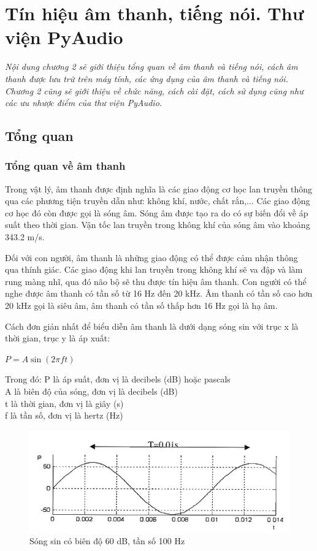 \chapter{Tín hiệu âm thanh, tiếng nói. Thư viện PyAudio}
\ifpdf
    \graphicspath{{Chapter2/Chapter2Figs/PNG/}{Chapter2/Chapter2Figs/PDF/}{Chapter2/Chapter2Figs/}}
\else
    \graphicspath{{Chapter2/Chapter2Figs/EPS/}{Chapter2/Chapter2Figs/}}
\fi
\textit{Nội dung chương 2 sẽ giới thiệu tổng quan về âm thanh và tiếng nói, cách âm thanh được lưu trữ trên máy tính, các ứng dụng của âm thanh và tiếng nói. Chương 2 cũng sẽ giới thiệu về chức năng, cách cài đặt, cách sử dụng cũng như các ưu nhược điểm của thư viện PyAudio.}
\section{Tổng quan}
\subsection{Tổng quan về âm thanh}
Trong vật lý, âm thanh được định nghĩa là các giao động cơ học lan truyền thông qua các phương tiện truyền dẫn như: không khí, nước, chất rắn,... Các giao động cơ học đó còn được gọi là sóng âm. Sóng âm được tạo ra do có sự biến đổi về áp suất theo thời gian. Vận tốc lan truyền trong không khí của sóng âm vào khoảng 343.2 m/s.

Đối với con người, âm thanh là những giao động có thể được cảm nhận thông qua thính giác. Các giao động khi lan truyền trong không khí sẽ va đập và làm rung màng nhĩ, qua đó não bộ sẽ thu được tín hiệu âm thanh. Con người có thể nghe được âm thanh có tần số từ 16 Hz đến 20 kHz. Âm thanh có tần số cao hơn 20 kHz gọi là siêu âm, âm thanh có tần số thấp hơn 16 Hz gọi là hạ âm.

Cách đơn giản nhất để biểu diễn âm thanh là dưới dạng sóng sin với trục x là thời gian, trục y là áp xuất:

\begin{center}
$P = A\sin (2\pi ft)$
\end{center}

Trong đó: P là áp suất, đơn vị là decibels (dB) hoặc pascals \\
A là biên độ của sóng, đơn vị là decibels (dB) \\
t là thời gian, đơn vị là giây (s) \\
f là tần số, đơn vị là hertz (Hz)

\begin{figure}[h]
    \centering
    \includegraphics[scale=1]{sinwave}
    \caption{Sóng sin có biên độ 60 dB, tần số 100 Hz}
    \label{fig:c2_sinwave}
\end{figure}

